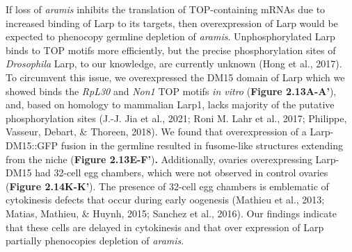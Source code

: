 \documentclass[12pt,oneside]{reedthesis}
\begin{document}
If loss of \emph{aramis} inhibits the translation of TOP-containing mRNAs due to increased binding of Larp to its targets, then overexpression of Larp would be expected to phenocopy germline depletion of \emph{aramis}. Unphosphorylated Larp binds to TOP motifs more efficiently, but the precise phosphorylation sites of \emph{Drosophila} Larp, to our knowledge, are currently unknown (Hong et al., 2017). To circumvent this issue, we overexpressed the DM15 domain of Larp which we showed binds the \emph{RpL30} and \emph{Non1} TOP motifs \emph{in vitro} (\textbf{Figure 2.13A-A'}), and, based on homology to mammalian Larp1, lacks majority of the putative phosphorylation sites (J.-J. Jia et al., 2021; Roni M. Lahr et al., 2017; Philippe, Vasseur, Debart, \& Thoreen, 2018). We found that overexpression of a Larp-DM15::GFP fusion in the germline resulted in fusome-like structures extending from the niche (\textbf{Figure 2.13E-F'})\textbf{.} Additionally, ovaries overexpressing Larp-DM15 had 32-cell egg chambers, which were not observed in control ovaries (\textbf{Figure 2.14K-K'}). The presence of 32-cell egg chambers is emblematic of cytokinesis defects that occur during early oogenesis (Mathieu et al., 2013; Matias, Mathieu, \& Huynh, 2015; Sanchez et al., 2016). Our findings indicate that these cells are delayed in cytokinesis and that over expression of Larp partially phenocopies depletion of \emph{aramis}.
\end{document}
